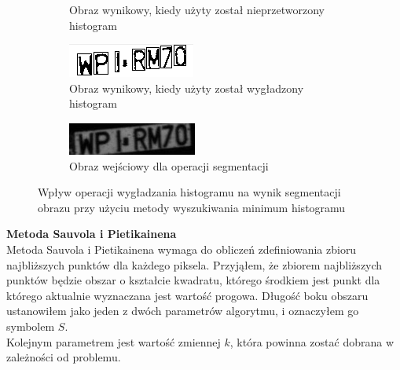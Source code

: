 \begin{figure}
\begin{subfigure}[b]{0.45\textwidth}
    \caption{Obraz wynikowy, kiedy użyty został nieprzetworzony histogram}
    \label{fig:research_min_histogram_bad_output}
  \end{subfigure}
  \begin{subfigure}[b]{0.45\textwidth}
    \includegraphics[width=\textwidth]{img/research-min-histogram-good-output}
    \caption{Obraz wynikowy, kiedy użyty został wygładzony histogram}
    \label{fig:research_min_histogram_good_output}
  \end{subfigure}
 \begin{subfigure}[b]{0.45\textwidth}
    \includegraphics[width=\textwidth]{img/research-min-histogram-input}
    \caption{Obraz wejściowy dla operacji segmentacji}
    \label{fig:research_min_histogram_input}
  \end{subfigure}
  \caption{Wpływ operacji wygładzania histogramu na wynik segmentacji obrazu przy użyciu metody wyszukiwania minimum histogramu}
  \label{fig:research_min_histogram}
\end{figure}

\textbf{Metoda Sauvola i Pietikainena} \\
Metoda Sauvola i Pietikainena wymaga do obliczeń zdefiniowania zbioru najbliższych punktów dla każdego piksela. Przyjąłem, że zbiorem najbliższych punktów będzie obszar o kształcie kwadratu, którego środkiem jest punkt dla którego aktualnie wyznaczana jest wartość progowa. Długość boku obszaru ustanowiłem jako jeden z dwóch parametrów algorytmu, i oznaczyłem go symbolem $S$. \\
Kolejnym parametrem jest wartość zmiennej $k$, która powinna zostać dobrana w zależności od problemu.\\


